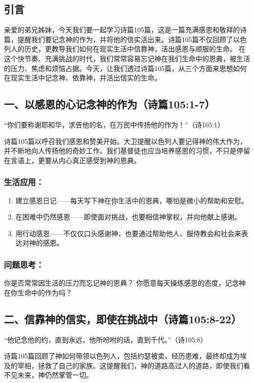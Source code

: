 \documentclass[a4paper, 12pt]{article}
\begin{document}
\subsection*{引言}
亲爱的弟兄姊妹，今天我们要一起学习诗篇105篇，这是一篇充满感恩和敬拜的诗篇，提醒我们要记念神的作为，并将他的信实活出来。诗篇105篇不仅回顾了以色列人的历史，更教导我们如何在现实生活中信靠神，活出感恩与顺服的生命。
在这个快节奏、充满挑战的时代，我们常常容易忘记神在我们生命中的恩典，被生活的压力、焦虑和烦恼占据。今天，让我们透过诗篇105篇，从三个方面来思想如何在现实生活中记念神、依靠神，并活出信实的生命。

\subsection*{一、以感恩的心记念神的作为（诗篇105:1-7）}
“你们要称谢耶和华，求告他的名，在万民中传扬他的作为！”（诗105:1）

诗篇105篇以呼召我们感恩和赞美开始。大卫提醒以色列人要记得神的伟大作为，并不断地向人传扬他的奇妙工作。我们基督徒也应当培养感恩的习惯，不只是停留在言语上，更要从内心真正感受到神的恩典。

\subsubsection*{生活应用：}
\begin{enumerate}
    \item 建立感恩日记——每天写下神在你生活中的恩典，哪怕是微小的帮助和安慰。
    \item 在困难中仍然感恩——即使面对挑战，也要相信神掌权，并向他献上感谢。

    \item 用行动感恩——不仅仅口头感谢神，也要通过帮助他人、服侍教会和社会来表达对神的感恩。

\end{enumerate}
\subsubsection*{问题思考：}

你是否常常因生活的压力而忘记神的恩典？
你愿意每天操练感恩的态度，记念神在你生命中的作为吗？
\subsection*{二、信靠神的信实，即使在挑战中（诗篇105:8-22）}
“他记念他的约，直到永远，他所吩咐的话，直到千代。”（诗105:8）

诗篇105篇回顾了神如何带领以色列人，包括约瑟被卖、经历患难，最终却成为埃及的宰相，拯救了自己的家族。这提醒我们，神的道路高过人的道路，即使我们看不见未来，神仍然掌管一切。
\end{document}

